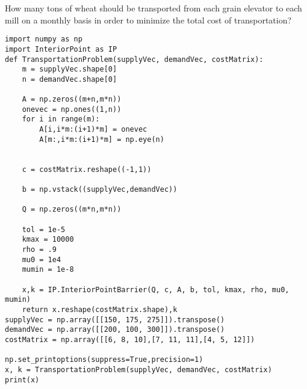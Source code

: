 \documentclass[11pt]{article}
\begin{document}
How many tons of wheat should be transported from each grain elevator to each mill on a monthly basis in order to minimize the total cost of transportation? 

\begin{verbatim}
import numpy as np
import InteriorPoint as IP
def TransportationProblem(supplyVec, demandVec, costMatrix):
    m = supplyVec.shape[0]
    n = demandVec.shape[0]

    A = np.zeros((m+n,m*n))
    onevec = np.ones((1,n))
    for i in range(m):
        A[i,i*m:(i+1)*m] = onevec
        A[m:,i*m:(i+1)*m] = np.eye(n)


    c = costMatrix.reshape((-1,1))

    b = np.vstack((supplyVec,demandVec))

    Q = np.zeros((m*n,m*n))

    tol = 1e-5
    kmax = 10000
    rho = .9
    mu0 = 1e4
    mumin = 1e-8

    x,k = IP.InteriorPointBarrier(Q, c, A, b, tol, kmax, rho, mu0, mumin)
    return x.reshape(costMatrix.shape),k
supplyVec = np.array([[150, 175, 275]]).transpose()
demandVec = np.array([[200, 100, 300]]).transpose()
costMatrix = np.array([[6, 8, 10],[7, 11, 11],[4, 5, 12]])

np.set_printoptions(suppress=True,precision=1)
x, k = TransportationProblem(supplyVec, demandVec, costMatrix)
print(x)
\end{verbatim}
\end{document}
